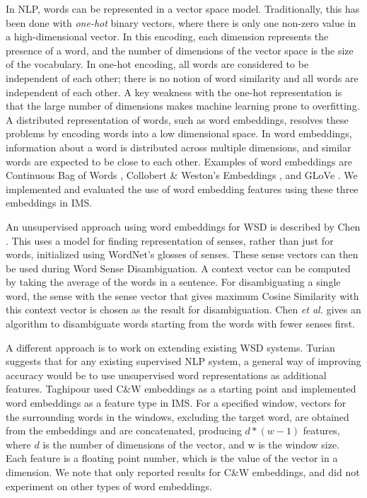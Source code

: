 In NLP, words can be represented in a vector space
model. Traditionally, this has been done with {\it one-hot} binary
vectors, where there is only one non-zero value in a high-dimensional
vector. In this encoding, each dimension represents the presence of a
word, and the number of dimensions of the vector space is the size of
the vocabulary. In one-hot encoding, all words are considered to be
independent of each other; there is no notion of word similarity and
all words are independent of each other.  A key weakness with the
one-hot representation is that the large number of dimensions makes
machine learning prone to overfitting.  A distributed representation
of words, such as word embeddings, resolves these problems by encoding
words into a low dimensional space. In word embeddings, information
about a word is distributed across multiple dimensions, and similar
words are expected to be close to each other. Examples of word
embeddings are Continuous Bag of Words \cite{mikolovword2vec},
Collobert \& Weston's Embeddings \cite{collobert2008unified}, and
GLoVe \cite{pennington2014glove}. We implemented and evaluated the use
of word embedding features using these three embeddings in IMS.

An unsupervised approach using word embeddings for WSD is described by
Chen . This uses a model for finding
representation of senses, rather than just for words, initialized
using WordNet's glosses of senses. These sense vectors can then be
used during Word Sense Disambiguation. A context vector can be
computed by taking the average of the words in a sentence. For
disambiguating a single word, the sense with the sense vector that
gives maximum Cosine Similarity with this context vector is chosen as
the result for disambiguation. Chen {\it et al.} gives an algorithm to
disambiguate words starting from the words with fewer senses first.

A different approach is to work on extending existing WSD
systems. Turian  suggests that
for any existing supervised NLP system, a general way of improving
accuracy would be to use unsupervised word representations as
additional features. Taghipour  used C\&W
embeddings as a starting point and implemented word embeddings as a
feature type in IMS. For a specified window, vectors for the
surrounding words in the windows, excluding the target word, are
obtained from the embeddings and are concatenated, producing $d *
(w-1)$ features, where $d$ is the number of dimensions of the vector,
and w is the window size. Each feature is a floating point number,
which is the value of the vector in a dimension. We note that
\cite{Taghipour15} only reported results for C\&W embeddings, and did
not experiment on other types of word embeddings.

